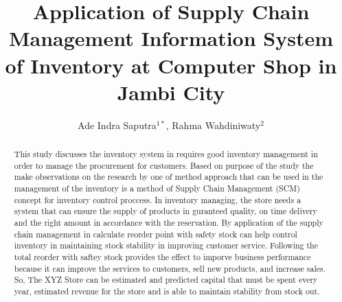\documentclass[12pt,a4paper,final]{iopart}
\begin{document}
\title[Preparing an article for INCITEST 2020]{Application of Supply Chain Management Information System of Inventory at Computer Shop in Jambi City}

\author{Ade Indra Saputra$^{1*}$, Rahma Wahdiniwaty$^{2}$}
\address{$^1$Master of Information System Study, Postgraduate Faculty, Universitas Komputer Indonesia}
\address{$^2$Master of Management Study, Postgraduate Faculty, Universitas Komputer Indonesia}




\begin{abstract}
This study discusses the inventory system in requires good inventory management in order to manage the procurement for customers. Based on purpose of the study the make observations on the research by one of method approach that can be used in the management of the inventory is a method of Supply Chain Management (SCM)  concept for inventory control proccess. In inventory managing, the store needs a system that can ensure the supply of products in guranteed quality, on time delivery and the right amount in accordance with the reservation. By application of the supply chain management in calculate reorder point with safety stock can help control inventory in maintaining stock stability in improving customer service. Following the total reorder with saftey stock provides the effect to imporve business performance because it can improve the services to customers, sell new products, and increase sales. So, The XYZ Store can be estimated and predicted capital that must be spent every year, estimated revenue for the store and is able to maintain stability from stock out.


\end{abstract}
\end{document}
